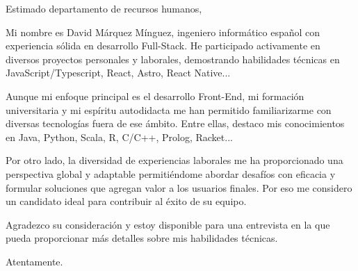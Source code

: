 \documentclass[letterpaper,11pt]{letter}
\begin{document}
\begin{letter}{}
\address{ Madrid, España}

\opening{Estimado departamento de recursos humanos,}

Mi nombre es David Márquez Mínguez, ingeniero informático español con experiencia sólida en desarrollo Full-Stack. He participado activamente en diversos 
proyectos personales y laborales, demostrando habilidades técnicas en JavaScript/Typescript, React, Astro, React Native...

Aunque mi enfoque principal es el desarrollo Front-End, mi formación universitaria y mi espíritu autodidacta me han permitido familiarizarme con diversas tecnologías 
fuera de ese ámbito. Entre ellas, destaco mis conocimientos en Java, Python, Scala, R, C/C++, Prolog, Racket...

Por otro lado, la diversidad de experiencias laborales me ha proporcionado una perspectiva global y adaptable permitiéndome abordar desafíos con eficacia y formular
soluciones que agregan valor a los usuarios finales. Por eso me considero  un candidato ideal para contribuir al éxito de su equipo.

Agradezco su consideración y estoy disponible para una entrevista en la que pueda proporcionar más detalles sobre mis habilidades técnicas.

\signature{\vspace{-35pt}David Márquez Mínguez}
\closing{Atentamente.}


\end{letter}
\end{document}
